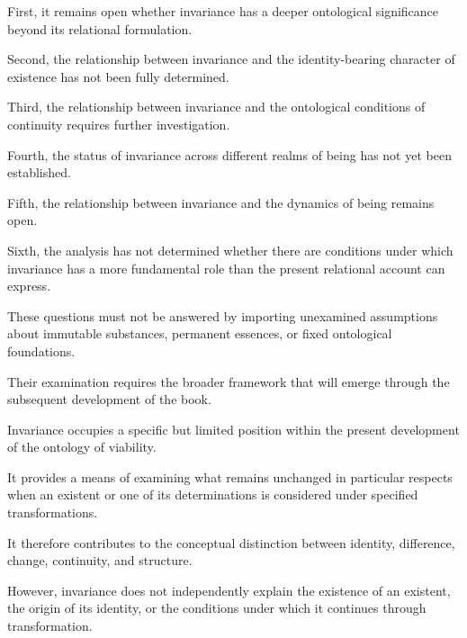 First, it remains open
whether invariance has
a deeper ontological
significance beyond its
relational formulation.

Second, the relationship
between invariance and
the identity-bearing
character of existence
has not been fully
determined.

Third, the relationship
between invariance and
the ontological conditions
of continuity requires
further investigation.

Fourth, the status of
invariance across different
realms of being has not
yet been established.

Fifth, the relationship
between invariance and
the dynamics of being
remains open.

Sixth, the analysis has
not determined whether
there are conditions under
which invariance has a
more fundamental role
than the present relational
account can express.

These questions must not
be answered by importing
unexamined assumptions
about immutable substances,
permanent essences, or
fixed ontological foundations.

Their examination requires
the broader framework
that will emerge through
the subsequent development
of the book.





Invariance occupies a specific
but limited position within
the present development
of the ontology of viability.

It provides a means of examining
what remains unchanged in
particular respects when
an existent or one of its
determinations is considered
under specified transformations.

It therefore contributes
to the conceptual distinction
between identity, difference,
change, continuity, and
structure.

However, invariance does
not independently explain
the existence of an existent,
the origin of its identity,
or the conditions under
which it continues through
transformation.

